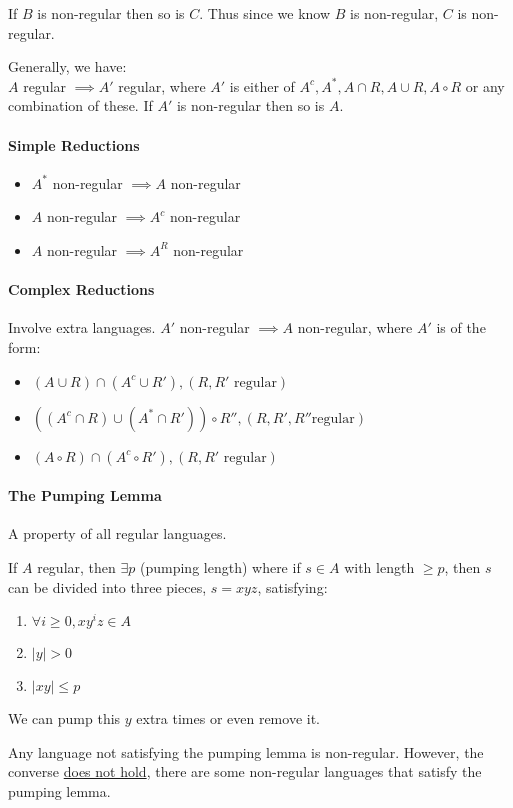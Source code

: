 \documentclass[12 pt]{article}
\begin{document}
If $B$ is non-regular then so is $C$. Thus since we know $B$ is
non-regular, $C$ is non-regular.

Generally, we have:
\\ $A$ regular $\implies A'$ regular, where $A'$ is either of $A^c,
A^*, A \cap R, A \cup R, A \circ R$ or any combination of these. If
$A'$ is non-regular then so is $A$.
\paragraph{Simple Reductions}
\begin{itemize}
\item $A^*$ non-regular $\implies A$ non-regular
\item $A$ non-regular $\implies A^c$ non-regular
\item $A$ non-regular $\implies A^R$ non-regular
\end{itemize}
\paragraph{Complex Reductions} Involve extra languages. $A'$
non-regular $\implies A$ non-regular, where $A'$ is of the form:
\begin{itemize}
\item $(A \cup R) \cap (A^c \cup R'), (R, R' \text{ regular})$
\item $((A^c \cap R) \cup (A^* \cap R')) \circ R'', (R, R', R'' \text{
  regular})$
\item $(A \circ R) \cap (A^c \circ R'), (R, R' \text{ regular})$
\end{itemize}
\paragraph{The Pumping Lemma} A property of all regular languages.

If $A$ regular, then $\exists p$ (pumping length) where if $s \in A$
with length $\geq p$, then $s$ can be divided into three pieces, $s =
xyz$, satisfying:
\begin{enumerate}
\item $\forall i \geq 0, xy^iz \in A$
\item $|y| > 0$
\item $|xy| \leq p$
\end{enumerate}
We can pump this $y$ extra times or even remove it.

Any language not satisfying the pumping lemma is non-regular. However,
the converse \underline{does not hold}, there are some non-regular
languages that satisfy the pumping lemma.
\end{document}
